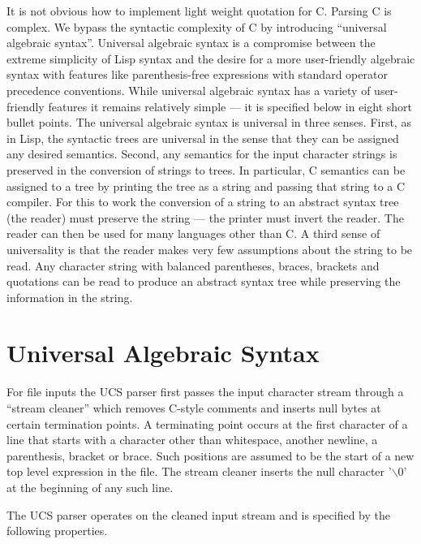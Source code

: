\documentclass{article}
\begin{document}
It is not obvious how to implement light weight quotation for C.  Parsing C is complex.  We bypass the syntactic complexity of C by introducing ``universal algebraic syntax''.
Universal algebraic syntax is a compromise between the extreme simplicity of Lisp syntax and the desire for a more user-friendly algebraic syntax with features like parenthesis-free
expressions with standard operator precedence conventions. While universal algebraic syntax has a variety of user-friendly features it remains relatively simple --- it is specified below in eight short bullet points.
The universal algebraic syntax is universal in three senses.  First, as in Lisp, the syntactic trees are universal in the sense that they can be assigned any desired semantics.
Second, any semantics for the input character strings is preserved in the conversion of strings to trees. In particular,
C semantics can be assigned to a tree by printing the tree as a string and passing that string to a C compiler.  For this to work the conversion of a string to an abstract syntax tree (the reader) must preserve the string
--- the printer must invert the reader.  The reader can then be used for many languages other than C.
A third sense of universality is that the reader makes very few assumptions about the string to be read.  Any character string with balanced parentheses, braces, brackets and quotations
can be read to produce an abstract syntax tree while preserving the information in the string.

\section{Universal Algebraic Syntax}

For file inputs the UCS parser first passes the input character stream through a ``stream cleaner'' which removes C-style comments  and inserts null bytes at certain termination points.
A terminating point occurs at the first character of a line that starts with a character other than whitespace, another newline, a parenthesis, bracket or brace.
Such positions are assumed to be the start of a new top level expression in the file.
The stream cleaner inserts the null character '$\backslash$0' at the beginning of any such line.

The UCS parser operates on the cleaned input stream and is specified by the following properties.
\end{document}
